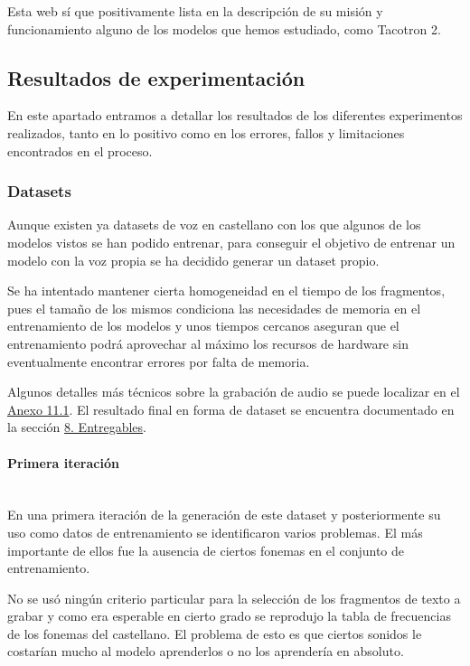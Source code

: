 Esta web sí que positivamente lista en la descripción de su misión y funcionamiento alguno de los modelos que hemos estudiado, como Tacotron 2.

\subsection{Resultados de experimentación}

En este apartado entramos a detallar los resultados de los diferentes experimentos realizados, tanto en lo positivo como en los errores, fallos y limitaciones encontrados en el proceso.

\subsubsection{Datasets}

Aunque existen ya datasets de voz en castellano con los que algunos de los modelos vistos se han podido entrenar, para conseguir el objetivo de entrenar un modelo con la voz propia se ha decidido generar un dataset propio.

Se ha intentado mantener cierta homogeneidad en el tiempo de los fragmentos, pues el tamaño de los mismos condiciona las necesidades de memoria en el entrenamiento de los modelos y unos tiempos cercanos aseguran que el entrenamiento podrá aprovechar al máximo los recursos de hardware sin eventualmente encontrar errores por falta de memoria.

Algunos detalles más técnicos sobre la grabación de audio se puede localizar en el \hyperref[Grabación de datasets]{Anexo 11.1}. El resultado final en forma de dataset se encuentra documentado en la sección \hyperref[Entregables]{8. Entregables}.

\paragraph{Primera iteración} ~\\

En una primera iteración de la generación de este dataset y posteriormente su uso como datos de entrenamiento se identificaron varios problemas. El más importante de ellos fue la ausencia de ciertos fonemas en el conjunto de entrenamiento. 

No se usó ningún criterio particular para la selección de los fragmentos de texto a grabar y como era esperable en cierto grado se reprodujo la tabla de frecuencias de los fonemas del castellano. El problema de esto es que ciertos sonidos le costarían mucho al modelo aprenderlos o no los aprendería en absoluto.


